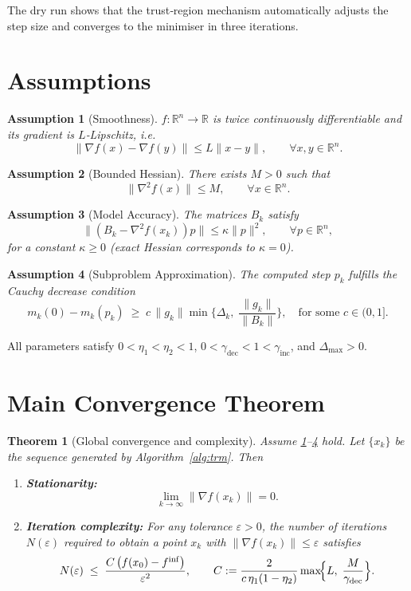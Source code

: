 \documentclass{article}
\newtheorem{theorem}{Theorem}
\newtheorem{assumption}{Assumption}
\newcommand{\RR}{\mathbb{R}}
\begin{document}
The dry run shows that the trust‑region mechanism automatically adjusts the step size and converges to the minimiser in three iterations.

\newpage
\section*{Assumptions}
\begin{assumption}[Smoothness]\label{as:smooth}
$f:\RR^{n}\rightarrow\RR$ is twice continuously differentiable and its gradient is $L$‑Lipschitz, i.e.
\[
\|\nabla f(x)-\nabla f(y)\|\le L\|x-y\|,\qquad\forall x,y\in\RR^{n}.
\]
\end{assumption}
\begin{assumption}[Bounded Hessian]\label{as:hessian}
There exists $M>0$ such that
\[
\|\nabla^{2}f(x)\|\le M,\qquad\forall x\in\RR^{n}.
\]
\end{assumption}
\begin{assumption}[Model Accuracy]\label{as:model}
The matrices $B_k$ satisfy
\[
\| (B_k-\nabla^{2}f(x_k))p\| \le \kappa\|p\|^{2},
\qquad\forall p\in\RR^{n},
\]
for a constant $\kappa\ge0$ (exact Hessian corresponds to $\kappa=0$).
\end{assumption}
\begin{assumption}[Subproblem Approximation]\label{as:sub}
The computed step $p_k$ fulfills the \emph{Cauchy decrease condition}
\[
m_k(0)-m_k(p_k)\;\ge\;c\,\|g_k\|\min\!\bigl\{\Delta_k,\;\frac{\|g_k\|}{\|B_k\|}\bigr\},
\quad\text{for some }c\in(0,1].
\]
\end{assumption}
All parameters satisfy $0<\eta_1<\eta_2<1$, $0<\gamma_{\text{dec}}<1<\gamma_{\text{inc}}$, and $\Delta_{\max}>0$.

\section*{Main Convergence Theorem}
\begin{theorem}[Global convergence and complexity]\label{thm:global}
Assume \ref{as:smooth}–\ref{as:sub} hold. Let $\{x_k\}$ be the sequence generated by Algorithm~\ref{alg:trm}. Then
\begin{enumerate}[label=(\roman*)]
\item \textbf{Stationarity:}
\[
\lim_{k\to\infty}\|\nabla f(x_k)\| = 0.
\]
\item \textbf{Iteration complexity:} For any tolerance $\varepsilon>0$, the number of iterations $N(\varepsilon)$ required to obtain a point $x_k$ with $\|\nabla f(x_k)\|\le\varepsilon$ satisfies
\[
N(\varepsilon)\;\le\;
\frac{C\,\bigl(f(x_0)-f^{\inf}\bigr)}{\varepsilon^{2}},
\qquad
C:=\frac{2}{c\,\eta_1(1-\eta_2)}\max\!\Bigl\{L,\;\frac{M}{\gamma_{\text{dec}}}\Bigr\}.
\]
\end{enumerate}
\end{theorem}
\end{document}
